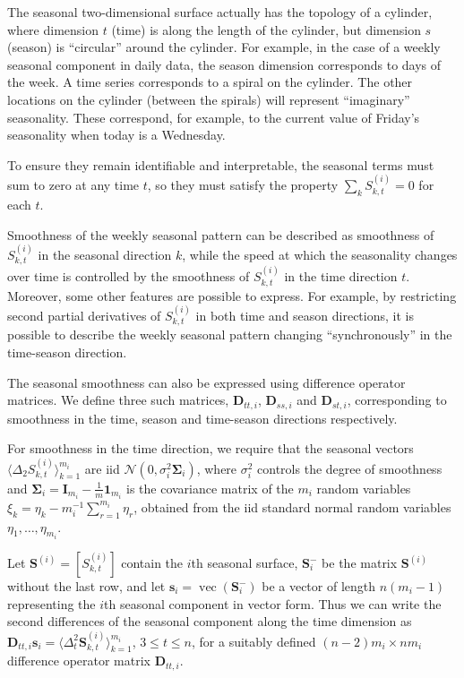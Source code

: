 \documentclass[ijds,nonblindrev]{informs-ijds}
\begin{document}
The seasonal two-dimensional surface actually has the topology of a cylinder, where dimension \(t\) (time) is along the length of the cylinder, but dimension \(s\) (season) is ``circular'' around the cylinder. For example, in the case of a weekly seasonal component in daily data, the season dimension corresponds to days of the week. A time series corresponds to a spiral on the cylinder. The other locations on the cylinder (between the spirals) will represent ``imaginary'' seasonality. These correspond, for example, to the current value of Friday's seasonality when today is a Wednesday.

To ensure they remain identifiable and interpretable, the seasonal terms must sum to zero at any time \(t\), so they must satisfy the property \(\sum\limits_k S^{(i)}_{k,t} = 0\) for each \(t\).

Smoothness of the weekly seasonal pattern can be described as smoothness of \(S^{(i)}_{k,t}\) in the seasonal direction \(k\), while the speed at which the seasonality changes over time is controlled by the smoothness of \(S^{(i)}_{k,t}\) in the time direction \(t\). Moreover, some other features are possible to express. For example, by restricting second partial derivatives of \(S^{(i)}_{k,t}\) in both time and season directions, it is possible to describe the weekly seasonal pattern changing ``synchronously'' in the time-season direction.

The seasonal smoothness can also be expressed using difference operator matrices. We define three such matrices, \(\bm{D}_{tt,i}\), \(\bm{D}_{ss,i}\) and \(\bm{D}_{st,i}\), corresponding to smoothness in the time, season and time-season directions respectively.

For smoothness in the time direction, we require that the seasonal vectors \(\langle \Delta_2 S^{(i)}_{k,t} \rangle_{k=1}^{m_i}\) are iid \(\mathcal{N}(0,\sigma_{i}^2 \bm{\Sigma}_{i} )\), where \(\sigma_i^2\) controls the degree of smoothness and \(\bm{\Sigma}_{i} = \bm{I}_{m_i} - \frac1m\bm{1}_{m_i}\) is the covariance matrix of the \(m_i\) random variables \(\xi_k = \eta_k - m_i^{-1}\sum\limits_{r = 1}^{m_i}\eta_r\), obtained from the iid standard normal random variables \(\eta_1,\dots,\eta_{m_i}\).

Let \(\bm{S}^{(i)} = [S_{k,t}^{(i)}]\) contain the \(i\)th seasonal surface, \(\bm{S}_i^{-}\) be the matrix \(\bm{S}^{(i)}\) without the last row, and let \(\bm{s}_i = \operatorname{vec}(\bm{S}_i^{-})\) be a vector of length \(n(m_i-1)\) representing the \(i\)th seasonal component in vector form. Thus we can write the second differences of the seasonal component along the time dimension as \(\bm{D}_{tt,i} \bm{s}_i = \langle \Delta^2_{t} \bm{S}^{(i)}_{k,t} \rangle_{k=1}^{m_i}\), \(3 \le t \le n\), for a suitably defined \((n-2)m_i \times nm_i\) difference operator matrix \(\bm{D}_{tt,i}\).
\end{document}
